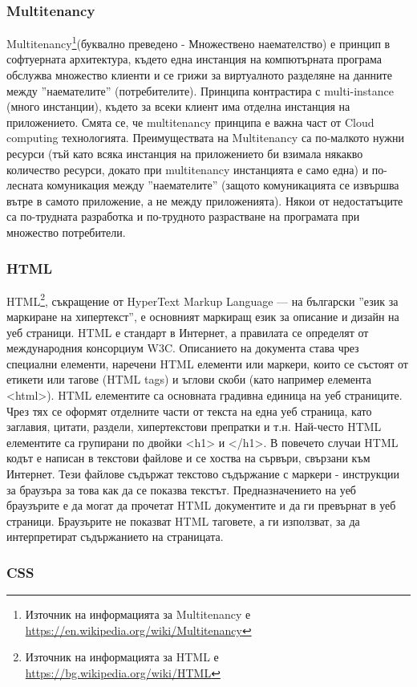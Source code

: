 \documentclass[pdftex,12pt,a4paper]{report}
\begin{document}
\subsubsection {Multitenancy}
Multitenancy\footnote{Източник на информацията за Multitenancy е \url{https://en.wikipedia.org/wiki/Multitenancy}}(буквално преведено - Множествено наемателство) е принцип в софтуерната архитектура, където една инстанция на компютърната програма обслужва множество клиенти и се грижи за виртуалното разделяне на данните между ''наемателите'' (потребителите). Принципа контрастира с multi-instance (много инстанции), където за всеки клиент има отделна инстанция на приложението. Смята се, че multitenancy принципа е важна част от Cloud computing технологията. Преимуществата на Multitenancy са по-малкото нужни ресурси (тъй като всяка инстанция на приложението би взимала някакво количество ресурси, докато при multitenancy инстанцията е само една) и по-лесната комуникация между ''наемателите'' (защото комуникацията се извършва вътре в самото приложение, а не между приложенията). Някои от недостатъците са по-трудната разработка и по-трудното разрастване на програмата при множество потребители.
\subsubsection {HTML}
HTML\footnote{Източник на информацията за HTML е \url{https://bg.wikipedia.org/wiki/HTML}}, съкращение от HyperText Markup Language — на български ''език за маркиране на хипертекст'', е основният маркиращ език за описание и дизайн на уеб страници. HTML е стандарт в Интернет, а правилата се определят от международния консорциум W3C. Описанието на документа става чрез специални елементи, наречени HTML елементи или маркери, които се състоят от етикети или тагове (HTML tags) и ъглови скоби (като например елемента <html>). HTML елементите са основната градивна единица на уеб страниците. Чрез тях се оформят отделните части от текста на една уеб страница, като заглавия, цитати, раздели, хипертекстови препратки и т.н. Най-често HTML елементите са групирани по двойки <h1> и </h1>.
В повечето случаи HTML кодът е написан в текстови файлове и се хоства на сървъри, свързани към Интернет. Тези файлове съдържат текстово съдържание с маркери - инструкции за браузъра за това как да се показва текстът. Предназначението на уеб браузърите е да могат да прочетат HTML документите и да ги превърнат в уеб страници. Браузърите не показват HTML таговете, а ги използват, за да интерпретират съдържанието на страницата.
\subsubsection {CSS}
\end{document}
